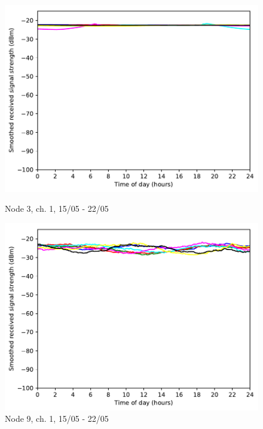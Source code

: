 \documentclass[a4paper, 11pt]{article}
\begin{document}
\begin{figure}[!h]
\begin{minipage}{0.47\textwidth}
    \centering
	\includegraphics[width=\textwidth]{images/2_4_GHz/cot-node3-student_2017-05-21_chan1_image}
    \caption{Node 3, ch. 1, 15/05 - 22/05} \label{node3-1}
\end{minipage}\hfill
\begin{minipage}{0.47\textwidth}
    \centering
	\includegraphics[width=\textwidth]{images/2_4_GHz/cot-node9-student_2017-05-21_chan1_image}
    \caption{Node 9, ch. 1, 15/05 - 22/05} \label{node9-1}

\end{minipage}\hfill
\end{figure}
\end{document}
